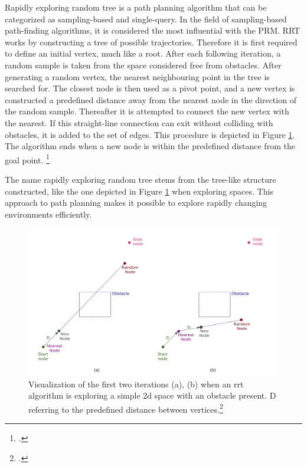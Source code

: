 Rapidly exploring random tree is a path planning algorithm that can be categorized as sampling-based and single-query. In the field of sampling-based path-finding algorithms, it is considered the most influential with the PRM. RRT works by constructing a tree of possible trajectories. Therefore it is first required to define an initial vertex, much like a root. After each following iteration, a random sample is taken from the space considered free from obstacles. After generating a random vertex, the nearest neighbouring point in the tree is searched for. The closest node is then used as a pivot point, and a new vertex is constructed a predefined distance away from the nearest node in the direction of the random sample. Thereafter it is attempted to connect the new vertex with the nearest. If this straight-line connection can exit without colliding with obstacles, it is added to the set of edges. This procedure is depicted in Figure \ref{fig:path_planning_rrt}. The algorithm ends when a new node is within the predefined distance from the goal point. 
\footcite{Karaman2011}

The name rapidly exploring random tree stems from the tree-like structure constructed, like the one depicted in Figure \ref{fig:path_planning_rrt} when exploring spaces. This approach to path planning makes it possible to explore rapidly changing environments efficiently.


\begin{figure}[h]
	\centering
	\includegraphics[width=0.9\linewidth]{img/rrtIteration}
	\caption{Visualization of the first two iterations (a), (b) when an rrt algorithm is exploring a simple 2d space with an obstacle present. D referring to the predefined distance between vertices.\footcite{Zammit2018}}
	\label{fig:path_planning_rrt}
\end{figure}

